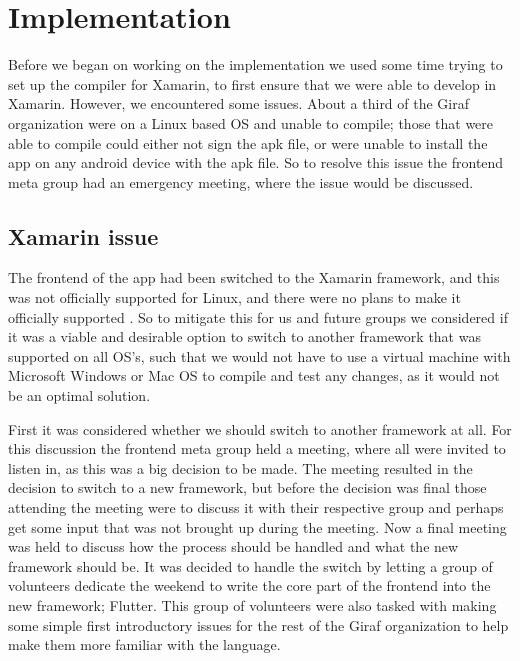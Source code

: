 \section{Implementation}
Before we began on working on the implementation we used some time trying to set up the compiler for Xamarin, to first ensure that we were able to develop in Xamarin.
However, we encountered some issues.
About a third of the Giraf organization were on a Linux based OS and unable to compile; those that were able to compile could either not sign the apk file, or were unable to install the app on any android device with the apk file.
So to resolve this issue the frontend meta group had an emergency meeting, where the issue would be discussed.

\subsection{Xamarin issue}
The frontend of the app had been switched to the Xamarin framework, and this was not officially supported for Linux, and there were no plans to make it officially supported \cite{xamarinSupport} \cite{xamarinSupport2}.
So to mitigate this for us and future groups we considered if it was a viable and desirable option to switch to another framework that was supported on all OS's, such that we would not have to use a virtual machine with Microsoft Windows or Mac OS to compile and test any changes, as it would not be an optimal solution.

First it was considered whether we should switch to another framework at all.
For this discussion the frontend meta group held a meeting, where all were invited to listen in, as this was a big decision to be made.
The meeting resulted in the decision to switch to a new framework, but before the decision was final those attending the meeting were to discuss it with their respective group and perhaps get some input that was not brought up during the meeting.
Now a final meeting was held to discuss how the process should be handled and what the new framework should be.
It was decided to handle the switch by letting a group of volunteers dedicate the weekend to write the core part of the frontend into the new framework; Flutter. 
This group of volunteers were also tasked with making some simple first introductory issues for the rest of the Giraf organization to help make them more familiar with the language.

